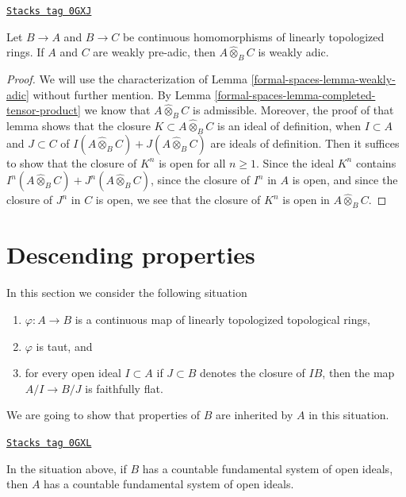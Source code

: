 \begin{lemma}
\label{formal-spaces-lemma-completed-tensor-product-weakly-adic}
\href{https://stacks.math.columbia.edu/tag/0GXJ}{\texttt{Stacks tag 0GXJ}}

Let $B \to A$ and $B \to C$ be continuous homomorphisms of
linearly topologized rings. If $A$ and $C$ are weakly pre-adic, then
$A \widehat{\otimes}_B C$ is weakly adic.
\end{lemma}

\begin{proof}
We will use the characterization of Lemma \ref{formal-spaces-lemma-weakly-adic}
without further mention. By Lemma \ref{formal-spaces-lemma-completed-tensor-product}
we know that $A \widehat{\otimes}_B C$ is admissible.
Moreover, the proof of that lemma shows that
the closure $K \subset A \widehat{\otimes}_B C$
is an ideal of definition, when $I \subset A$ and $J \subset C$
of $I(A \widehat{\otimes}_B C) + J(A \widehat{\otimes}_B C)$
are ideals of definition. Then it suffices to show that
the closure of $K^n$ is open for all $n \geq 1$.
Since the ideal $K^n$ contains
$I^n(A \widehat{\otimes}_B C) + J^n(A \widehat{\otimes}_B C)$,
since the closure of $I^n$ in $A$ is open, and
since the closure of $J^n$ in $C$ is open, we
see that the closure of $K^n$ is open in $A \widehat{\otimes}_B C$.
\end{proof}

\section{Descending properties}
\label{formal-spaces-section-taut-descent}
In this section we consider the following situation
\begin{enumerate}
\item $\varphi : A \to B$ is a continuous map of
linearly topologized topological rings,
\item $\varphi$ is taut, and
\item for every open ideal $I \subset A$ if $J \subset B$
denotes the closure of $IB$, then the map $A/I \to B/J$
is faithfully flat.
\end{enumerate}
We are going to show that properties of $B$ are inherited
by $A$ in this situation.

\begin{lemma}
\label{formal-spaces-lemma-taut-descent-countable}
\href{https://stacks.math.columbia.edu/tag/0GXL}{\texttt{Stacks tag 0GXL}}

In the situation above, if $B$ has a countable fundamental system of
open ideals, then $A$ has a countable fundamental system of open ideals.
\end{lemma}

